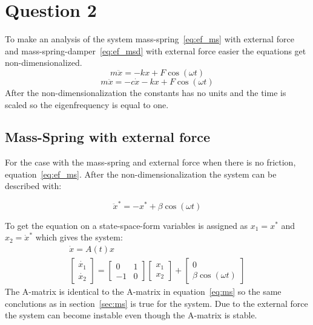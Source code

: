 \documentclass[
  twoside,
  11pt, a4paper,
  footinclude=true,
  headinclude=true,
  cleardoublepage=empty
]{scrbook}
\begin{document}
\chapter{Question 2}
To make an analysis of the system mass-spring~\eqref{eq:ef_ms} with external force and mass-spring-damper~\eqref{eq:ef_msd} with external force easier the equations get non-dimensionalized.
\begin{equation}\label{eq:ef_ms}
	m \ddot{x} = -k x + F \cos(\omega t)
\end{equation}
\begin{equation}\label{eq:ef_msd}
	m \ddot{x} = -c \dot{x} -k x + F \cos(\omega t)
\end{equation}
After the non-dimensionalization the constants has no units and the time is scaled so the eigenfrequency is equal to one. 

\section{Mass-Spring with external force}
For the case with the mass-spring and external force when there is no friction, equation~\eqref{eq:ef_ms}. After the non-dimensionalization the system can be described with:

\begin{equation}
	\ddot{x}^*=-x^*+\beta\cos(\omega t)
\end{equation}

To get the equation on a state-space-form variables is assigned as $x_1=x^*$ and $x_2=\dot{x}^*$ which gives the system:
\begin{equation}
	\begin{gathered}
		\dot{x}=A(t)x\\
		\begin{bmatrix}
			\dot{x_1}\\
			\dot{x_2}
		\end{bmatrix}=\begin{bmatrix}
			0	&	1\\
			-1	&	0
		\end{bmatrix}\begin{bmatrix}
			x_1\\
			x_2
		\end{bmatrix}+\begin{bmatrix}
			0\\
			\beta \cos(\omega t)
		\end{bmatrix}
	\end{gathered}
\end{equation}
The A-matrix is identical to the A-matrix in equation~\eqref{eq:ms} so the same conclutions as in section~\ref{sec:ms} is true for the system. Due to the external force the system can become instable even though the A-matrix is stable.
\end{document}
